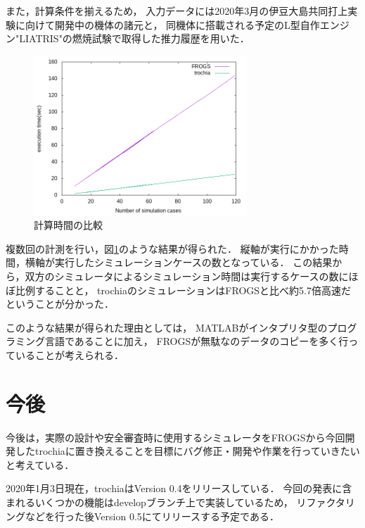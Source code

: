 \documentclass[a4j,10pt]{jsarticle}
\begin{document}
また，計算条件を揃えるため，
入力データには2020年3月の伊豆大島共同打上実験に向けて開発中の機体の諸元と，
同機体に搭載される予定のL型自作エンジン"LIATRIS"の燃焼試験で取得した推力履歴を用いた．

\begin{figure}[htbp]
	\begin{center}
		\includegraphics[width=8cm]{./sim-time.png}
		\caption{計算時間の比較}
		\label{sim-time}
	\end{center}
\end{figure}

複数回の計測を行い，図\ref{sim-time}のような結果が得られた．
縦軸が実行にかかった時間，横軸が実行したシミュレーションケースの数となっている．
この結果から，双方のシミュレータによるシミュレーション時間は実行するケースの数にほぼ比例することと，
trochiaのシミュレーションはFROGSと比べ約5.7倍高速だということが分かった．

このような結果が得られた理由としては，
MATLABがインタプリタ型のプログラミング言語であることに加え，
FROGSが無駄なのデータのコピーを多く行っていることが考えられる．

\section{今後}

今後は，実際の設計や安全審査時に使用するシミュレータをFROGSから今回開発したtrochiaに置き換えることを目標にバグ修正・開発や作業を行っていきたいと考えている．

2020年1月3日現在，trochiaはVersion 0.4をリリースしている．
今回の発表に含まれるいくつかの機能はdevelopブランチ上で実装しているため，
リファクタリングなどを行った後Version 0.5にてリリースする予定である．
\end{document}
